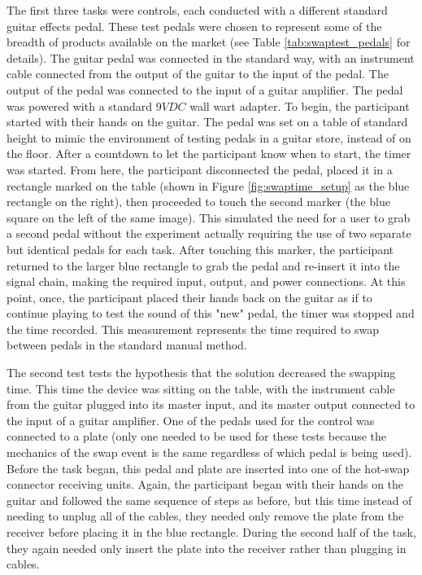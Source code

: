 		The first three tasks were controls, each conducted with a different standard guitar effects pedal.  These test pedals were chosen to represent some of the breadth of products available on the market (see Table \ref{tab:swaptest_pedals} for details).  The guitar pedal was connected in the standard way, with an instrument cable connected from the output of the guitar to the input of the pedal.  The output of the pedal was connected to the input of a guitar amplifier.  The pedal was powered with a standard $9VDC$ wall wart adapter.  To begin, the participant started with their hands on the guitar.  The pedal was set on a table of standard height to mimic the environment of testing pedals in a guitar store, instead of on the floor.  After a countdown to let the participant know when to start, the timer was started.  From here, the participant disconnected the pedal, placed it in a rectangle marked on the table (shown in Figure \ref{fig:swaptime_setup} as the blue rectangle on the right), then proceeded to touch the second marker (the blue square on the left of the same image).  This simulated the need for a user to grab a second pedal without the experiment actually requiring the use of two separate but identical pedals for each task.  After touching this marker, the participant returned to the larger blue rectangle to grab the pedal and re-insert it into the signal chain, making the required input, output, and power connections.  At this point, once, the participant placed their hands back on the guitar as if to continue playing to test the sound of this "new" pedal, the timer was stopped and the time recorded.  This measurement represents the time required to swap between pedals in the standard manual method.

		The second test tests the hypothesis that the solution decreased the swapping time.  This time the device was sitting on the table, with the instrument cable from the guitar plugged into its master input, and its master output connected to the input of a guitar amplifier.  One of the pedals used for the control was connected to a plate (only one needed to be used for these tests because the mechanics of the swap event is the same regardless of which pedal is being used).  Before the task began, this pedal and plate are inserted into one of the hot-swap connector receiving units.  Again, the participant began with their hands on the guitar and followed the same sequence of steps as before, but this time instead of needing to unplug all of the cables, they needed only remove the plate from the receiver before placing it in the blue rectangle.  During the second half of the task, they again needed only insert the plate into the receiver rather than plugging in cables.


